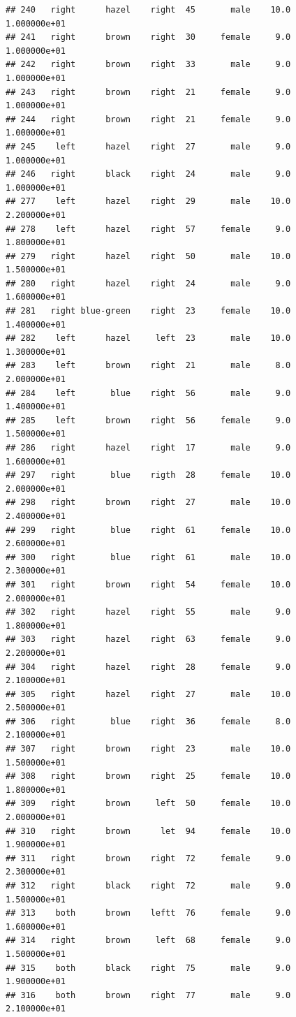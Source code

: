 \documentclass[]{article}
\begin{document}
\begin{verbatim}
## 240   right      hazel    right  45       male    10.0  1.000000e+01
## 241   right      brown    right  30     female     9.0  1.000000e+01
## 242   right      brown    right  33       male     9.0  1.000000e+01
## 243   right      brown    right  21     female     9.0  1.000000e+01
## 244   right      brown    right  21     female     9.0  1.000000e+01
## 245    left      hazel    right  27       male     9.0  1.000000e+01
## 246   right      black    right  24       male     9.0  1.000000e+01
## 277    left      hazel    right  29       male    10.0  2.200000e+01
## 278    left      hazel    right  57     female     9.0  1.800000e+01
## 279   right      hazel    right  50       male    10.0  1.500000e+01
## 280   right      hazel    right  24       male     9.0  1.600000e+01
## 281   right blue-green    right  23     female    10.0  1.400000e+01
## 282    left      hazel     left  23       male    10.0  1.300000e+01
## 283    left      brown    right  21       male     8.0  2.000000e+01
## 284    left       blue    right  56       male     9.0  1.400000e+01
## 285    left      brown    right  56     female     9.0  1.500000e+01
## 286   right      hazel    right  17       male     9.0  1.600000e+01
## 297   right       blue    rigth  28     female    10.0  2.000000e+01
## 298   right      brown    right  27       male    10.0  2.400000e+01
## 299   right       blue    right  61     female    10.0  2.600000e+01
## 300   right       blue    right  61       male    10.0  2.300000e+01
## 301   right      brown    right  54     female    10.0  2.000000e+01
## 302   right      hazel    right  55       male     9.0  1.800000e+01
## 303   right      hazel    right  63     female     9.0  2.200000e+01
## 304   right      hazel    right  28     female     9.0  2.100000e+01
## 305   right      hazel    right  27       male    10.0  2.500000e+01
## 306   right       blue    right  36     female     8.0  2.100000e+01
## 307   right      brown    right  23       male    10.0  1.500000e+01
## 308   right      brown    right  25     female    10.0  1.800000e+01
## 309   right      brown     left  50     female    10.0  2.000000e+01
## 310   right      brown      let  94     female    10.0  1.900000e+01
## 311   right      brown    right  72     female     9.0  2.300000e+01
## 312   right      black    right  72       male     9.0  1.500000e+01
## 313    both      brown    leftt  76     female     9.0  1.600000e+01
## 314   right      brown     left  68     female     9.0  1.500000e+01
## 315    both      black    right  75       male     9.0  1.900000e+01
## 316    both      brown    right  77       male     9.0  2.100000e+01

\end{verbatim}
\end{document}
